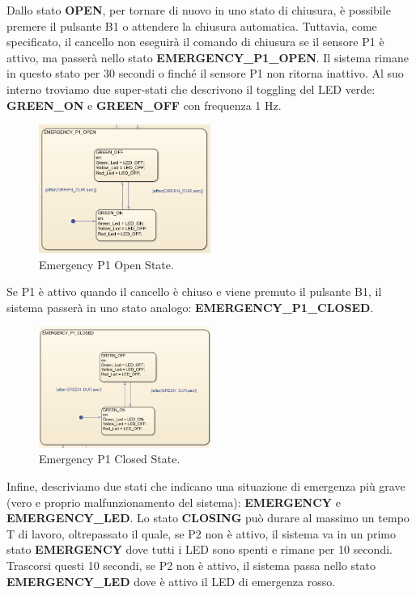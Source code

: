 \documentclass[12pt]{article}
\begin{document}
Dallo stato \textbf{OPEN}, per tornare di nuovo in uno stato di chiusura, è possibile premere il pulsante B1 o attendere la chiusura automatica. Tuttavia, come specificato, il cancello non eseguirà il comando di chiusura se il sensore P1 è attivo, ma passerà nello stato \textbf{EMERGENCY\_P1\_OPEN}. Il sistema rimane in questo stato per 30 secondi o finché il sensore P1 non ritorna inattivo. Al suo interno troviamo due super-stati che descrivono il toggling del LED verde: \textbf{GREEN\_ON} e \textbf{GREEN\_OFF} con frequenza 1 Hz.
\vspace{1.5cm}
\begin{figure}[H]
    \centering
    \includegraphics[width=0.5\textwidth]{imm/Emergency_P1_Open.png}
    \caption{Emergency P1 Open State.}
\end{figure}
\vspace{1.5cm}
\noindent Se P1 è attivo quando il cancello è chiuso e viene premuto il pulsante B1, il sistema passerà in uno stato analogo: \textbf{EMERGENCY\_P1\_CLOSED}.
\vspace{1cm}
\begin{figure}[H]
    \centering
    \includegraphics[width=0.5\textwidth]{imm/Emergency_P1_Closed.png}
    \caption{Emergency P1 Closed State.}
\end{figure}

\noindent Infine, descriviamo due stati che indicano una situazione di emergenza più grave (vero e proprio malfunzionamento del sistema): \textbf{EMERGENCY} e \textbf{EMERGENCY\_LED}. Lo stato \textbf{CLOSING} può durare al massimo un tempo T di lavoro, oltrepassato il quale, se P2 non è attivo, il sistema va in un primo stato \textbf{EMERGENCY} dove tutti i LED sono spenti e rimane per 10 secondi. Trascorsi questi 10 secondi, se P2 non è attivo, il sistema passa nello stato \textbf{EMERGENCY\_LED} dove è attivo il LED di emergenza rosso.
\end{document}
